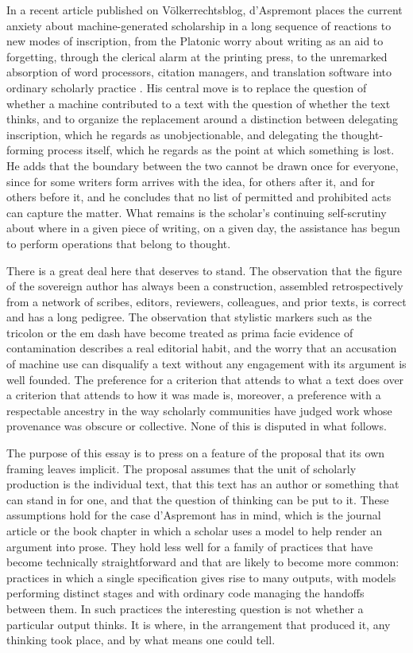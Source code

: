 \documentclass[12pt]{article}
\begin{document}
In a recent article published on Völkerrechtsblog, d'Aspremont places the current anxiety about machine-generated scholarship in a long sequence of reactions to new modes of inscription, from the Platonic worry about writing as an aid to forgetting, through the clerical alarm at the printing press, to the unremarked absorption of word processors, citation managers, and translation software into ordinary scholarly practice \cite{daspremont2026}. His central move is to replace the question of whether a machine contributed to a text with the question of whether the text thinks, and to organize the replacement around a distinction between delegating inscription, which he regards as unobjectionable, and delegating the thought-forming process itself, which he regards as the point at which something is lost. He adds that the boundary between the two cannot be drawn once for everyone, since for some writers form arrives with the idea, for others after it, and for others before it, and he concludes that no list of permitted and prohibited acts can capture the matter. What remains is the scholar's continuing self-scrutiny about where in a given piece of writing, on a given day, the assistance has begun to perform operations that belong to thought.

There is a great deal here that deserves to stand. The observation that the figure of the sovereign author has always been a construction, assembled retrospectively from a network of scribes, editors, reviewers, colleagues, and prior texts, is correct and has a long pedigree. The observation that stylistic markers such as the tricolon or the em dash have become treated as prima facie evidence of contamination describes a real editorial habit, and the worry that an accusation of machine use can disqualify a text without any engagement with its argument is well founded. The preference for a criterion that attends to what a text does over a criterion that attends to how it was made is, moreover, a preference with a respectable ancestry in the way scholarly communities have judged work whose provenance was obscure or collective. None of this is disputed in what follows.

The purpose of this essay is to press on a feature of the proposal that its own framing leaves implicit. The proposal assumes that the unit of scholarly production is the individual text, that this text has an author or something that can stand in for one, and that the question of thinking can be put to it. These assumptions hold for the case d'Aspremont has in mind, which is the journal article or the book chapter in which a scholar uses a model to help render an argument into prose. They hold less well for a family of practices that have become technically straightforward and that are likely to become more common: practices in which a single specification gives rise to many outputs, with models performing distinct stages and with ordinary code managing the handoffs between them. In such practices the interesting question is not whether a particular output thinks. It is where, in the arrangement that produced it, any thinking took place, and by what means one could tell.
\end{document}
